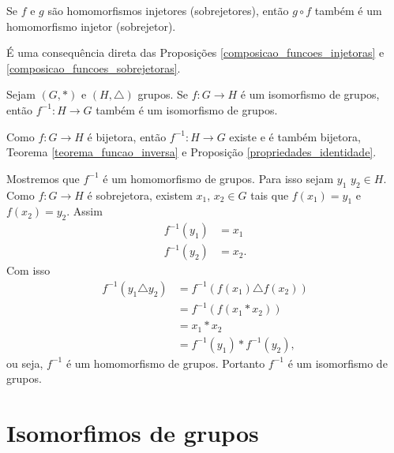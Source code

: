 \begin{corolario}
    Se $f$ e $g$ são homomorfismos injetores (sobrejetores), então $g \circ f$ também é um homomorfismo injetor (sobrejetor).
\end{corolario}
\begin{prova}
    \'E uma consequência direta das Proposições \eqref{composicao_funcoes_injetoras} e \eqref{composicao_funcoes_sobrejetoras}.
\end{prova}


\begin{proposicao}
    Sejam $(G, *)$ e $(H, \triangle)$ grupos. Se $f : G \to H$ é um isomorfismo de grupos, então $f^{-1} : H \to G$ também é um isomorfismo de grupos.
\end{proposicao}
\begin{prova}
    Como $f : G \to H$ é bijetora, então $f^{-1} : H \to G$ existe e é também bijetora, Teorema \eqref{teorema_funcao_inversa} e Proposição \eqref{propriedades_identidade}.

    Mostremos que $f^{-1}$ é um homomorfismo de grupos. Para isso sejam $y_1$ $y_2 \in H$. Como $f : G \to H$ é sobrejetora, existem $x_1$, $x_2 \in G$ tais que $f(x_1) = y_1$ e $f(x_2) = y_ 2$. Assim
    \begin{align*}
        f^{-1}(y_1) &= x_1\\
        f^{-1}(y_2) &= x_2.
    \end{align*}
    Com isso
    \begin{align*}
        f^{-1}(y_1 \triangle y_2) &= f^{-1}(f(x_1) \triangle f(x_2)) \\ &= f^{-1}(f(x_1 * x_2)) \\ &= x_1 * x_2 \\ &= f^{-1}(y_1) * f^{-1}(y_2),
    \end{align*}
    ou seja, $f^{-1}$ é um homomorfismo de grupos.
    Portanto $f^{-1}$ é um isomorfismo de grupos.
\end{prova}

\section{Isomorfimos de grupos} %
\label{sec:isomorfismos_de_grupos}

